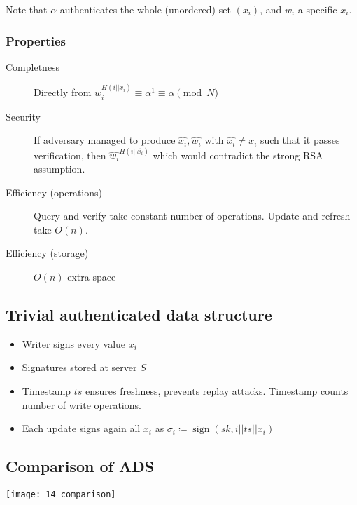 Note that $\alpha$ authenticates the whole (unordered) set $(x_i)$, and $w_i$ a
specific $x_i$.

\subsubsection{Properties}

\begin{description}
  \item[Completness] Directly from $w_i^{H(i || x_i)} \equiv \alpha^1 \equiv
    \alpha \pmod{N}$
  \item[Security] If adversary managed to produce $\hat{x_i}, \hat{w_i}$ with
    $\hat{x_i} \neq x_i$ such that it passes verification, then $\hat{w_i}^{H(i
    || \hat{x_i})}$ which would contradict the strong RSA assumption.
  \item[Efficiency (operations)] Query and verify take constant number of
    operations. Update and refresh take $O(n)$.
  \item[Efficiency (storage)] $O(n)$ extra space
\end{description}

\subsection{Trivial authenticated data structure}

\begin{itemize}
  \item Writer signs every value $x_i$
  \item Signatures stored at server $S$
  \item Timestamp $ts$ ensures freshness, prevents replay attacks. Timestamp
    counts number of write operations.
  \item Each update signs again all $x_i$ as $\sigma_i \coloneqq \operatorname{sign}(sk, i || ts || x_i)$
\end{itemize}

\subsection{Comparison of ADS}

\texttt{[image: 14\_comparison]}
